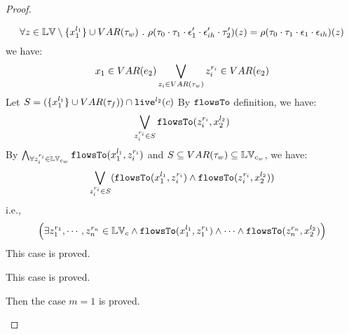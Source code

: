 \begin{proof}
\begin{case}[$\trace_2 = \trace_{ih} \cdot \event_{ih}$]
\begin{subcase}
\begin{subsubcase}
\begin{subproof}
\begin{enumerate}
\[
  \forall z \in \mathbb{LV} \setminus \{x_1^{l_1}\} \cup VAR{(\mathtt{\tau}_w)} ~.~
  \rho(\mathtt{\tau}_0 \cdot \mathtt{\tau}_1 \cdot \mathtt{\epsilon}_1'\cdot \mathtt{\epsilon}_{ih}' \cdot \mathtt{\tau}_2')(z) 
  = \rho(\mathtt{\tau}_0 \cdot \mathtt{\tau}_1 \cdot \mathtt{\epsilon}_1\cdot \mathtt{\epsilon}_{ih})(z)
\]
%
we have:
\[
  x_1 \in VAR(e_2) \bigvee_{z_i \in VAR{(\mathtt{\tau}_w)}} z_i^{r_i} \in VAR(e_2)
\]
%
Let $S = (\{x_1^{l_1}\} \cup VAR{(\mathtt{\tau}_f)}) \cap \mathtt{live}^{l_2}(c) $
%
By $\mathtt{flowsTo}$ definition, we have:
\[
   \bigvee_{z_i^{r_i} \in S}  \mathtt{flowsTo}(z_i^{r_i}, x_2^{l_2})
\]
By $ \bigwedge_{\forall z_i^{r_i} \in \mathbb{LV}_{c_w}} \mathtt{flowsTo}(x_1^{l_1}, z_i^{r_i})$ and $S \subseteq VAR{(\mathtt{\tau}_w)} \subseteq \mathbb{LV}_{c_w}$, we have:
\[
\bigvee_{z_i^{r_i} \in S} 
(\mathtt{flowsTo}(x_1^{l_1}, z_i^{r_i}) \land \mathtt{flowsTo}(z_i^{r_i}, x_2^{l_2}))
\]
%
i.e.,
\[
\Big(\exists z_1^{r_1}, \cdots, z_n^{r_n} \in \mathbb{LV}_{{c}}
 \land \mathtt{flowsTo}(x_1^{l_1}, z_1^{r_1}) \land \cdots \land \mathtt{flowsTo}(z_n^{r_n}, {x}_2^{l_2}) \Big)
\]
%
This case is proved.
\end{enumerate}
\end{subproof}
%
This case is proved.
\end{subsubcase}
%
Then the case $m = 1$ is proved.
\end{subcase}
\end{case}
%

\end{proof}
